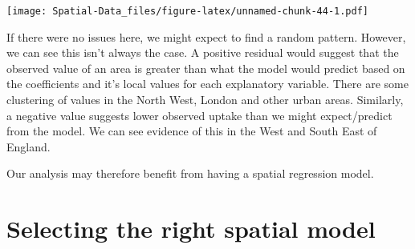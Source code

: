 \documentclass[
]{book}
\newenvironment{Shaded}{\begin{snugshade}}{\end{snugshade}}
\newcommand{\AttributeTok}[1]{\textcolor[rgb]{0.77,0.63,0.00}{#1}}
\newcommand{\CommentTok}[1]{\textcolor[rgb]{0.56,0.35,0.01}{\textit{#1}}}
\newcommand{\DecValTok}[1]{\textcolor[rgb]{0.00,0.00,0.81}{#1}}
\newcommand{\FunctionTok}[1]{\textcolor[rgb]{0.00,0.00,0.00}{#1}}
\newcommand{\NormalTok}[1]{#1}
\newcommand{\OtherTok}[1]{\textcolor[rgb]{0.56,0.35,0.01}{#1}}
\newcommand{\SpecialCharTok}[1]{\textcolor[rgb]{0.00,0.00,0.00}{#1}}
\newcommand{\StringTok}[1]{\textcolor[rgb]{0.31,0.60,0.02}{#1}}
\begin{document}
\begin{Shaded}
\end{Shaded}

\texttt{[image: Spatial-Data\_files/figure-latex/unnamed-chunk-44-1.pdf]}

If there were no issues here, we might expect to find a random pattern. However, we can see this isn't always the case. A positive residual would suggest that the observed value of an area is greater than what the model would predict based on the coefficients and it's local values for each explanatory variable. There are some clustering of values in the North West, London and other urban areas. Similarly, a negative value suggests lower observed uptake than we might expect/predict from the model. We can see evidence of this in the West and South East of England.

Our analysis may therefore benefit from having a spatial regression model.

\hypertarget{selecting-the-right-spatial-model}{%
\section{Selecting the right spatial model}\label{selecting-the-right-spatial-model}}
\end{document}
